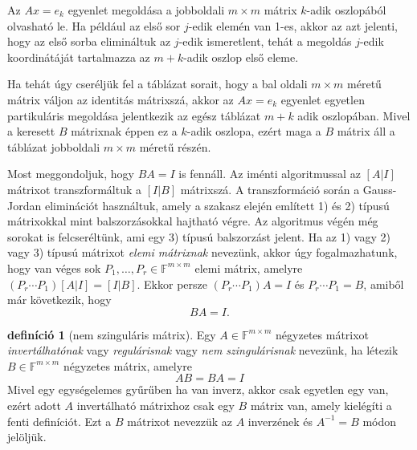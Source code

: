 \documentclass[9pt, a4paper, showtrims]{memoir}
\theoremstyle{plain}
\theoremstyle{remark}
\theoremstyle{definition}
\newtheorem{definition}[proposition]{definíció}
\begin{document}
Az $Ax=e_k$ egyenlet megoldása a jobboldali $m\times m$ mátrix $k$-adik oszlopából olvasható le. 
Ha például az első sor $j$-edik elemén van 1-es, 
akkor az azt jelenti, hogy az első sorba elimináltuk az $j$-edik ismeretlent, 
tehát a megoldás $j$-edik koordinátáját tartalmazza az $m+k$-adik oszlop első eleme.

Ha tehát úgy cseréljük fel a táblázat sorait, 
hogy a bal oldali $m\times m$ méretű mátrix váljon az identitás mátrixszá, 
akkor az $Ax=e_k$ egyenlet egyetlen partikuláris megoldása jelentkezik az egész táblázat
$m+k$ adik oszlopában.
Mivel a keresett $B$ mátrixnak éppen ez a $k$-adik oszlopa,
ezért maga a $B$ mátrix áll a táblázat jobboldali $m\times m$ méretű részén.

Most meggondoljuk, hogy $BA=I$ is fennáll.
Az iménti algoritmussal az $[A|I]$ mátrixot transzformáltuk a $[I|B]$ mátrixszá.
A transzformáció során a Gauss-Jordan eliminációt használtuk,  amely a szakasz elején említett 1) és 2) típusú mátrixokkal mint balszorzásokkal hajtható végre.
Az algoritmus végén még sorokat is felcseréltünk, ami egy 3) típusú balszorzást jelent.
Ha az 1) vagy 2) vagy 3) típusú mátrixot \emph{elemi mátrixnak}
nevezünk, 
akkor úgy fogalmazhatunk, 
hogy van véges sok $P_1,\dots,P_r\in\mathbb{F}^{m\times m}$ elemi mátrix, amelyre
\(
(P_r\cdots P_1)\left[ A|I \right]=\left[ I|B \right].
\)
Ekkor persze $(P_r\cdots P_1)A=I$ és $P_r\cdots P_1=B$,
amiből már következik, hogy
\[
    BA=I.
\]

\begin{definition}[nem szinguláris mátrix]
    Egy $A\in\mathbb{F}^{m\times m}$ négyzetes mátrixot 
    \emph{invertálhatónak} vagy 
    \emph{regulárisnak} vagy \emph{nem szingulárisnak} nevezünk,
    ha létezik $B\in\mathbb{F}^{m\times m}$ négyzetes mátrix, 
    amelyre
    \[
        AB=BA=I
    \]
    Mivel egy egységelemes gyűrűben ha van inverz, akkor csak egyetlen egy van,
    ezért adott $A$ invertálható mátrixhoz csak egy $B$ mátrix van, amely kielégíti a fenti definíciót.
    Ezt a $B$ mátrixot nevezzük az $A$ inverzének és $A^{-1}=B$ módon jelöljük.
\end{definition}
\end{document}
